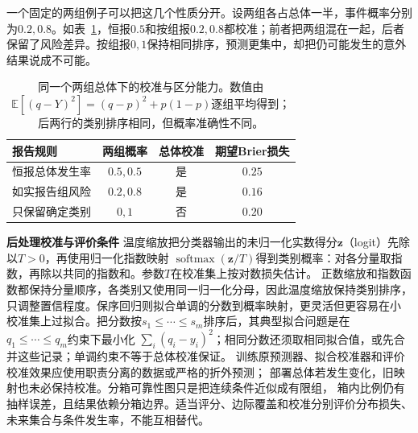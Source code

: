 一个固定的两组例子可以把这几个性质分开。设两组各占总体一半，事件概率分别为\(0.2,0.8\)。如表~\ref{tab:statistics-calibration-discrimination}，恒报\(0.5\)和按组报\(0.2,0.8\)都校准；前者把两组混在一起，后者保留了风险差异。按组报\(0,1\)保持相同排序，预测更集中，却把仍可能发生的意外结果说成不可能。
\begin{table}[htbp]
  \centering
  \small
  \begin{tabular}{lccc}
    \toprule
    报告规则 & 两组概率 & 总体校准 & 期望Brier损失 \\
    \midrule
    恒报总体发生率 & \(0.5,0.5\) & 是 & \(0.25\) \\
    如实报告组风险 & \(0.2,0.8\) & 是 & \(0.16\) \\
    只保留确定类别 & \(0,1\) & 否 & \(0.20\) \\
    \bottomrule
  \end{tabular}
  \caption{同一个两组总体下的校准与区分能力。数值由\(\mathbb E[(q-Y)^2]=(q-p)^2+p(1-p)\)逐组平均得到；后两行的类别排序相同，但概率准确性不同。}
  \label{tab:statistics-calibration-discrimination}
\end{table}

\par\medskip\noindent\textbf{后处理校准与评价条件}\quad
温度缩放把分类器输出的未归一化实数得分\(\bm z\)（logit）先除以\(T>0\)，再使用归一化指数映射
\(\operatorname{softmax}(\bm z/T)\)得到类别概率：对各分量取指数，再除以共同的指数和。参数\(T\)在校准集上按对数损失估计。
正数缩放和指数函数都保持分量顺序，各类别又使用同一归一化分母，因此温度缩放保持类别排序，只调整置信程度。保序回归则拟合单调的分数到概率映射，更灵活但更容易在小
校准集上过拟合。把分数按\(s_1\leq\cdots\leq s_m\)排序后，其典型拟合问题是在
\(q_1\leq\cdots\leq q_m\)约束下最小化
\(\sum_i(q_i-y_i)^2\)；相同分数还须取相同拟合值，或先合并这些记录；单调约束不等于总体校准保证。
训练原预测器、拟合校准器和评价校准效果应使用职责分离的数据或严格的折外预测；
部署总体若发生变化，旧映射也未必保持校准。分箱可靠性图只是把连续条件近似成有限组，
箱内比例仍有抽样误差，且结果依赖分箱边界。适当评分、边际覆盖和校准分别评价分布损失、
未来集合与条件发生率，不能互相替代。

